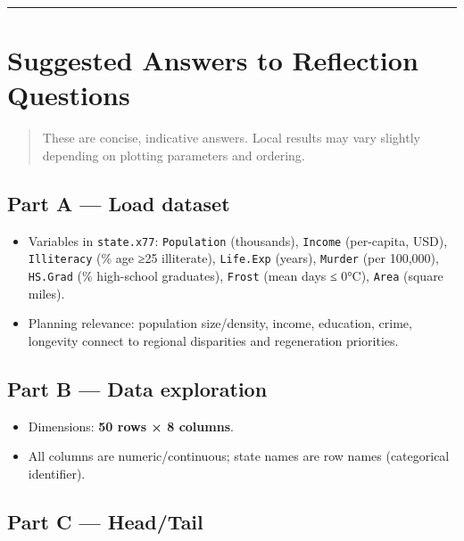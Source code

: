 \documentclass[
  letterpaper,
  DIV=11,
  numbers=noendperiod]{scrreprt}
\providecommand{\tightlist}{%
  \setlength{\itemsep}{0pt}\setlength{\parskip}{0pt}}
\begin{document}
\begin{center}\rule{0.5\linewidth}{0.5pt}\end{center}

\section{Suggested Answers to Reflection
Questions}\label{suggested-answers-to-reflection-questions-2}

\begin{quote}
These are concise, indicative answers. Local results may vary slightly
depending on plotting parameters and ordering.
\end{quote}

\subsection{Part A --- Load dataset}\label{part-a-load-dataset-1}

\begin{itemize}
\tightlist
\item
  Variables in \texttt{state.x77}: \texttt{Population} (thousands),
  \texttt{Income} (per-capita, USD), \texttt{Illiteracy} (\% age ≥25
  illiterate), \texttt{Life.Exp} (years), \texttt{Murder} (per 100,000),
  \texttt{HS.Grad} (\% high-school graduates), \texttt{Frost} (mean days
  ≤ 0°C), \texttt{Area} (square miles).\\
\item
  Planning relevance: population size/density, income, education, crime,
  longevity connect to regional disparities and regeneration priorities.
\end{itemize}

\subsection{Part B --- Data
exploration}\label{part-b-data-exploration-1}

\begin{itemize}
\tightlist
\item
  Dimensions: \textbf{50 rows × 8 columns}.\\
\item
  All columns are numeric/continuous; state names are row names
  (categorical identifier).
\end{itemize}

\subsection{Part C --- Head/Tail}\label{part-c-headtail}
\end{document}

